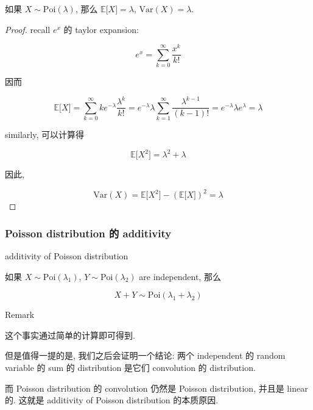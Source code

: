 \documentclass{qlnotes-export}
\begin{document}
\begin{proposition}\label{prop-02-random-variables-proposition-013}

如果 \(X \sim \text{Poi}(\lambda)\), 那么 \({\mathbb{E}}\lbrack X\rbrack = \lambda\), \(\text{Var}(X) = \lambda\).

\end{proposition}

\begin{proof}

recall \(e^{x}\) 的 taylor expansion:

\[e^{x} = \sum\limits_{k = 0}^{\infty}\frac{x^{k}}{k!}\]

因而

\[{\mathbb{E}}\lbrack X\rbrack = \sum\limits_{k = 0}^{\infty}ke^{- \lambda}\frac{\lambda^{k}}{k!} = e^{- \lambda}\lambda\sum\limits_{k = 1}^{\infty}\frac{\lambda^{k - 1}}{(k - 1)!} = e^{- \lambda}\lambda e^{\lambda} = \lambda\]

similarly, 可以计算得

\[{\mathbb{E}}\lbrack X^{2}\rbrack = \lambda^{2} + \lambda\]

因此,

\[\text{Var}(X) = {\mathbb{E}}\lbrack X^{2}\rbrack - ({\mathbb{E}}\lbrack X\rbrack)^{2} = \lambda\]

\end{proof}

\subsubsection{Poisson distribution 的 additivity}\label{poisson-distribution-ux7684-additivity}

\begin{theorem}{additivity of Poisson distribution}\label{thm-02-random-variables-additivity-of-poisson-distribution}

如果 \(X \sim \text{Poi}(\lambda_{1})\), \(Y \sim \text{Poi}(\lambda_{2})\) are independent, 那么

\[X + Y \sim \text{Poi}(\lambda_{1} + \lambda_{2})\]

\end{theorem}

\begin{qlremark}{Remark}

这个事实通过简单的计算即可得到.

但是值得一提的是, 我们之后会证明一个结论: 两个 independent 的 random variable 的 sum 的 distribution 是它们 convolution 的 distribution.

而 Poisson distribution 的 convolution 仍然是 Poisson distribution, 并且是 linear 的. 这就是 additivity of Poisson distribution 的本质原因.

\end{qlremark}
\end{document}

